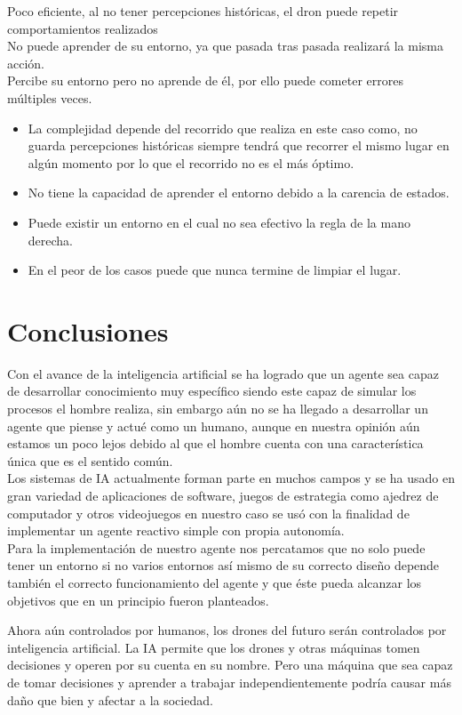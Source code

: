 \documentclass[12pt]{article}
\begin{document}
Poco eficiente, al no tener percepciones históricas, el dron puede repetir comportamientos realizados\\
No puede aprender de su entorno, ya que pasada tras pasada realizará la misma acción.\\
Percibe su entorno pero no aprende de él, por ello puede cometer errores múltiples veces.
\begin{itemize}
    \item La complejidad depende del recorrido que realiza en este caso como, no guarda
percepciones históricas siempre tendrá que recorrer el mismo lugar en algún momento
por lo que el recorrido no es el más óptimo.
    \item No tiene la capacidad de aprender el entorno debido a la carencia de estados.
    \item Puede existir un entorno en el cual no sea efectivo la regla de la mano derecha.
    \item En el peor de los casos puede que nunca termine de limpiar el lugar.
\end{itemize}

\section{Conclusiones}

Con el avance de la inteligencia artificial se ha logrado que un agente sea capaz de desarrollar
conocimiento muy específico siendo este capaz de simular los procesos el hombre realiza, sin
embargo aún no se ha llegado a desarrollar un agente que piense y actué como un humano,
aunque en nuestra opinión aún estamos un poco lejos debido al que el hombre cuenta con una
característica única que es el sentido común.\\

Los sistemas de IA actualmente forman parte en muchos campos y se ha usado en gran
variedad de aplicaciones de software, juegos de estrategia como ajedrez de computador y otros
videojuegos en nuestro caso se usó con la finalidad de implementar un agente reactivo simple con
propia autonomía.\\

Para la implementación de nuestro agente nos percatamos que no solo puede tener un entorno si
no varios entornos así mismo de su correcto diseño depende también el correcto funcionamiento
del agente y que éste pueda alcanzar los objetivos que en un principio fueron planteados.


Ahora aún controlados por humanos, los drones del futuro serán controlados por inteligencia artificial. La IA permite que los drones y otras máquinas tomen decisiones y operen por su cuenta en su nombre. Pero una máquina que sea capaz de tomar decisiones y aprender a trabajar independientemente podría causar más daño que bien y afectar a la sociedad.
\end{document}
